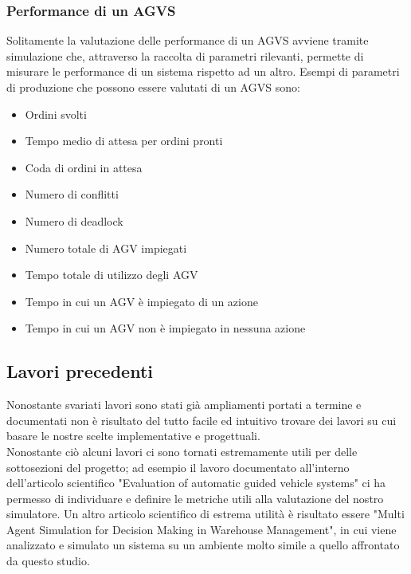 \documentclass[12pt]{article}
\begin{document}
\subsubsection{Performance di un AGVS}
Solitamente la valutazione delle performance di un AGVS avviene tramite simulazione che, attraverso la raccolta di parametri rilevanti, permette di misurare le performance di un sistema rispetto ad un altro. Esempi di parametri di produzione che possono essere valutati di un AGVS sono:
\begin{itemize}
\setlength\itemsep{0.1em}
    \item Ordini svolti
    \item Tempo medio di attesa per ordini pronti
    \item Coda di ordini in attesa
    \item Numero di conflitti
    \item Numero di deadlock
    \item Numero totale di AGV impiegati
    \item Tempo totale di utilizzo degli AGV
    \item Tempo in cui un AGV è impiegato di un azione
    \item Tempo in cui un AGV non è impiegato in nessuna azione
\end{itemize}

\subsection{Lavori precedenti}
Nonostante svariati lavori sono stati già ampliamenti portati a termine e documentati non è risultato del tutto facile ed intuitivo trovare dei lavori su cui basare le nostre scelte implementative e progettuali.\\

\noindent Nonostante ciò alcuni lavori ci sono tornati estremamente utili per delle sottosezioni del progetto; ad esempio il lavoro documentato all'interno dell'articolo scientifico "Evaluation of automatic guided vehicle systems" \cite{EvaluationAGVS} ci ha permesso di individuare e definire le metriche utili alla valutazione del nostro simulatore. \noindent Un altro articolo scientifico di estrema utilità è risultato essere "Multi Agent Simulation for Decision Making in Warehouse Management"\cite{MAS_Warehouse}, in cui viene analizzato e simulato un sistema su un ambiente molto simile a quello affrontato da questo studio.

\newpage
\end{document}
